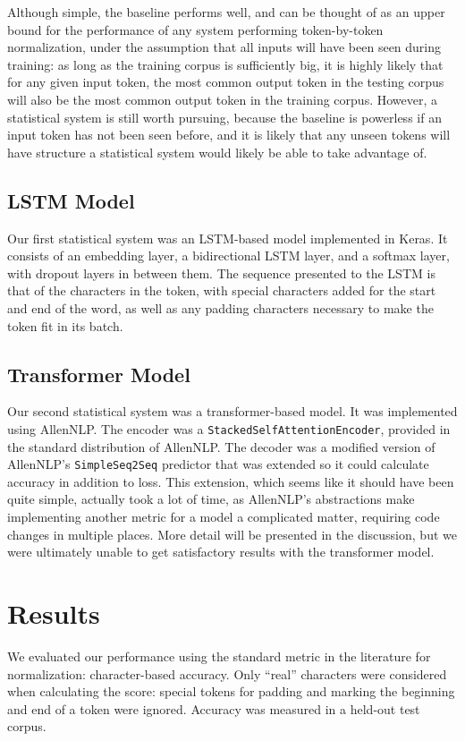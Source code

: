 \documentclass[11pt,a4paper]{article}
\begin{document}
Although simple, the baseline performs well, and can be thought of as an upper bound for the performance of any system performing token-by-token normalization, under the assumption that all inputs will have been seen during training: as long as the training corpus is sufficiently big, it is highly likely that for any given input token, the most common output token in the testing corpus will also be the most common output token in the training corpus. However, a statistical system is still worth pursuing, because the baseline is powerless if an input token has not been seen before, and it is likely that any unseen tokens will have structure a statistical system would likely be able to take advantage of.

\subsection{LSTM Model}
Our first statistical system was an LSTM-based model implemented in Keras. It consists of an embedding layer, a bidirectional LSTM layer, and a softmax layer, with dropout layers in between them. The sequence presented to the LSTM is that of the characters in the token, with special characters added for the start and end of the word, as well as any padding characters necessary to make the token fit in its batch.

\subsection{Transformer Model}
Our second statistical system was a transformer-based model. It was implemented using AllenNLP. The encoder was a \texttt{StackedSelfAttentionEncoder}, provided in the standard distribution of AllenNLP. The decoder was a modified version of AllenNLP’s \texttt{SimpleSeq2Seq} predictor that was extended so it could calculate accuracy in addition to loss. This extension, which seems like it should have been quite simple, actually took a lot of time, as AllenNLP’s abstractions make implementing another metric for a model a complicated matter, requiring code changes in multiple places. More detail will be presented in the discussion, but we were ultimately unable to get satisfactory results with the transformer model.

\section{Results}
We evaluated our performance using the standard metric in the literature for normalization: character-based accuracy. Only ``real'' characters were considered when calculating the score: special tokens for padding and marking the beginning and end of a token were ignored. Accuracy was measured in a held-out test corpus.
\end{document}
